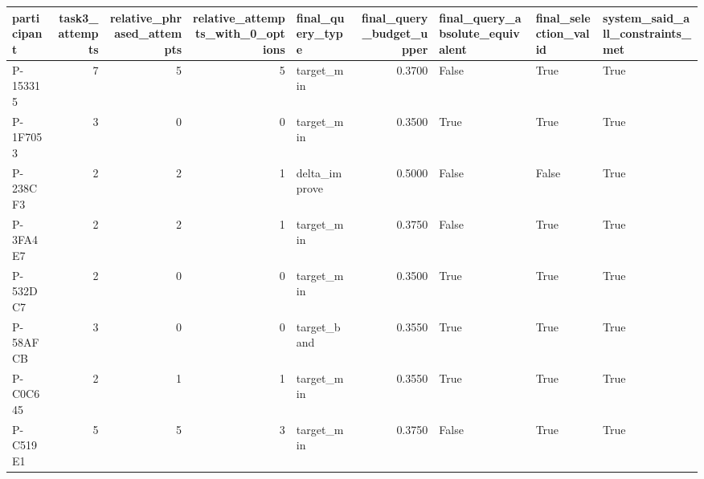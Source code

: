 \begin{tabular}{lrrrlrlll}
\toprule
participant &  task3\_attempts &  relative\_phrased\_attempts &  relative\_attempts\_with\_0\_options & final\_query\_type &  final\_query\_budget\_upper &  final\_query\_absolute\_equivalent &  final\_selection\_valid &  system\_said\_all\_constraints\_met \\
\midrule
   P-153315 &               7 &                          5 &                                 5 &       target\_min &                    0.3700 &                            False &                   True &                             True \\
   P-1F7053 &               3 &                          0 &                                 0 &       target\_min &                    0.3500 &                             True &                   True &                             True \\
   P-238CF3 &               2 &                          2 &                                 1 &    delta\_improve &                    0.5000 &                            False &                  False &                             True \\
   P-3FA4E7 &               2 &                          2 &                                 1 &       target\_min &                    0.3750 &                            False &                   True &                             True \\
   P-532DC7 &               2 &                          0 &                                 0 &       target\_min &                    0.3500 &                             True &                   True &                             True \\
   P-58AFCB &               3 &                          0 &                                 0 &      target\_band &                    0.3550 &                             True &                   True &                             True \\
   P-C0C645 &               2 &                          1 &                                 1 &       target\_min &                    0.3550 &                             True &                   True &                             True \\
   P-C519E1 &               5 &                          5 &                                 3 &       target\_min &                    0.3750 &                            False &                   True &                             True \\

\end{tabular}
